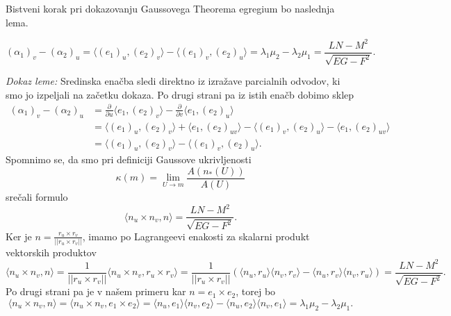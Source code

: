 Bistveni korak pri dokazovanju Gaussovega Theorema egregium bo naslednja lema.
\begin{lema}
\begin{equation*}
(\alpha_1)_v - (\alpha_2)_u = \langle  (e_1)_u, (e_2)_v \rangle - \langle (e_1)_v , (e_2)_u \rangle  = \lambda_1 \mu_2 - \lambda_2 \mu_1 =  \frac{LN - M^2}{\sqrt{EG - F^2} }.
\end{equation*}  
\end{lema}

\noindent
{\em Dokaz leme:\/}
Sredinska enačba sledi direktno iz izražave parcialnih odvodov, ki smo jo izpeljali na začetku dokaza. Po drugi strani pa iz istih enačb dobimo sklep \begin{align*}
    (\alpha_1)_v - (\alpha_2)_u &= \frac{ \partial  }{ \partial u }  \langle e_1, (e_2)_v \rangle - \frac{ \partial  }{ \partial v}  \langle e_1, (e_2)_u \rangle \\
     &= \langle  (e_1)_u, (e_2)_v \rangle + \langle  e_1, (e_2)_{uv} \rangle  - \langle  (e_1)_v, (e_2)_u \rangle - \langle  e_1, (e_2)_{uv} \rangle \\
     &= \langle  (e_1)_u, (e_2)_v \rangle - \langle  (e_1)_v, (e_2)_u \rangle.
\end{align*}
Spomnimo se, da smo pri definiciji Gaussove ukrivljenosti \begin{equation*}
\kappa(m) = \lim_{U \to m} \frac{A(n_{*}(U))}{A(U)}
\end{equation*}  
srečali formulo \begin{equation*}
\langle n_u \times n_v, n \rangle = \frac{LN - M^2}{\sqrt{EG - F^2}}. 
\end{equation*}  
Ker je $n = \frac{r_u \times r_v}{\lvert\lvert r_u \times  r_v \rvert\rvert }$, imamo po Lagrangeevi enakosti za skalarni produkt vektorskih produktov \begin{equation*}
\langle n_u \times n_v, n \rangle = \frac{1}{\lvert\lvert r_u \times  r_v \rvert\rvert } \langle n_u \times  n_v, r_u \times r_v \rangle = \frac{1}{\lvert\lvert r_u \times  r_v \rvert\rvert } (\langle n_u, r_u \rangle \langle n_v, r_v \rangle - \langle n_u, r_v \rangle \langle n_v, r_u \rangle) = \frac{LN - M^2}{\sqrt{EG - F^2} } . 
\end{equation*}
Po drugi strani pa je v našem primeru kar $n = e_1 \times  e_2$, torej bo \begin{equation*}
\langle n_u \times  n_v, n \rangle = \langle n_u \times  n_v, e_1 \times e_2 \rangle = \langle n_u, e_1 \rangle \langle n_v, e_2 \rangle - \langle n_u, e_2 \rangle \langle n_v , e_1\rangle = \lambda_1 \mu_2 - \lambda_2 \mu_1. 
\end{equation*}  
